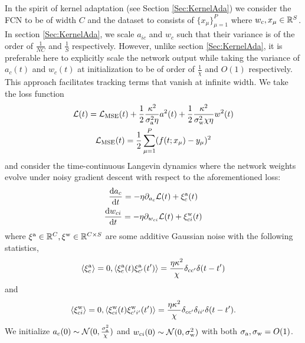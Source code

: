  In the spirit of kernel adaptation (see Section \ref{Sec:KernelAda}) we consider the FCN to be of width $C$ and the dataset to consists of $\{ {x}_{\mu} \}_{\mu=1}^{P}$ where ${w}_c, {x}_{\mu} \in {\mathbb{R}}^{S}$. In section \ref{Sec:KernelAda}, we scale $a_{ic}$ and $w_c$ such that their variance is of the order of $\frac{1}{NC}$ and $\frac{1}{S}$ respectively. However, unlike section \ref{Sec:KernelAda}, it is preferable here to explicitly scale the network output while taking the variance of $a_c(t)$ and $w_c(t)$ at initialization to be of order of $\frac{1}{\chi}$ and $O(1)$ respectively. This approach facilitates tracking terms that vanish at infinite width. 
We take the loss function
\begin{gather}
    \mathcal{L}(t) =\mathcal{L}_{\text{MSE}}(t)+\frac{1}{2}\frac{\kappa^2 }{\sigma_{\rm a}^2 \eta}  a^2(t) +\frac{1}{2}\frac{\kappa^2 }{\sigma_{\rm w}^2\chi\eta} w^2(t)\\
    \mathcal{L}_{\text{MSE}}(t)=\frac{1}{2} \sum\limits_{\mu=1}^P (f(t;{x}_\mu)-y_\mu)^2
\end{gather}
and consider the time-continuous Langevin dynamics where the network weights evolve under noisy gradient descent with respect to the aforementioned loss:
\begin{gather} \label{dynamics_TB}
    \frac{\text{d} a_c }{\text{d} t}=-\eta \partial_{a_c}\mathcal{L}(t)+{\xi}^{\rm a}_{c}(t) \\  \nonumber
    \frac{\text{d} w_{ci} }{\text{d} t}=-\eta \partial_{w_{ci}}\mathcal{L}(t)+{\xi}^{\rm w}_{ci}(t)
\end{gather}
where $\xi^{\rm a}\in \mathbb{R}^C, \xi^{\rm w}\in \mathbb{R}^{C\times S}$ are some additive Gaussian noise with the following statistics,
\begin{equation}
    \langle \xi^{\rm a}_c \rangle=0, \langle \xi^{\rm a}_{c}(t) \xi^{\rm a}_{c'}(t')\rangle=\frac{\eta\kappa^2}{\chi}\delta_{cc'}\delta(t-t')
\end{equation}
and
\begin{equation}
    \langle \xi^{\rm w}_{ci}\rangle=0,\langle \xi^{\rm w}_{ci}(t) \xi^{\rm w}_{c'i'}(t')\rangle=\frac{\eta\kappa^2}{\chi} \delta_{cc'}\delta_{ii'}\delta(t-t').
\end{equation}
We initialize $a_c(0)\sim\mathcal{N}(0,\frac{\sigma_{\rm a}^2}{\chi})$ and $w_{ci}(0)\sim\mathcal{N}(0,\sigma_{\rm w}^2)$ with both $\sigma_{\rm a},\sigma_{\rm w}=O(1)$. %

